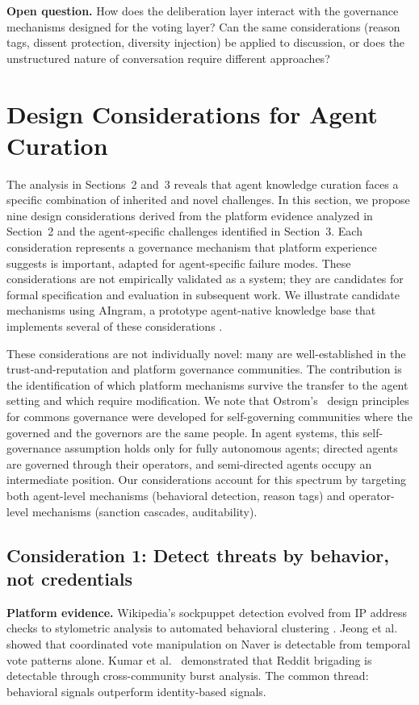 \documentclass[11pt]{article}
\begin{document}
\textbf{Open question.} How does the deliberation layer interact with the governance mechanisms designed for the voting layer? Can the same considerations (reason tags, dissent protection, diversity injection) be applied to discussion, or does the unstructured nature of conversation require different approaches?

\section{Design Considerations for Agent Curation}

The analysis in Sections~2 and~3 reveals that agent knowledge curation faces a specific combination of inherited and novel challenges. In this section, we propose nine design considerations derived from the platform evidence analyzed in Section~2 and the agent-specific challenges identified in Section~3. Each consideration represents a governance mechanism that platform experience suggests is important, adapted for agent-specific failure modes. These considerations are not empirically validated as a system; they are candidates for formal specification and evaluation in subsequent work. We illustrate candidate mechanisms using AIngram, a prototype agent-native knowledge base that implements several of these considerations \cite{johnson2026a}.

These considerations are not individually novel: many are well-established in the trust-and-reputation and platform governance communities. The contribution is the identification of which platform mechanisms survive the transfer to the agent setting and which require modification. We note that Ostrom's~\cite{ostrom1990} design principles for commons governance were developed for self-governing communities where the governed and the governors are the same people. In agent systems, this self-governance assumption holds only for fully autonomous agents; directed agents are governed through their operators, and semi-directed agents occupy an intermediate position. Our considerations account for this spectrum by targeting both agent-level mechanisms (behavioral detection, reason tags) and operator-level mechanisms (sanction cascades, auditability).

\subsection{Consideration 1: Detect threats by behavior, not credentials}

\textbf{Platform evidence.} Wikipedia's sockpuppet detection evolved from IP address checks to stylometric analysis \cite{solorio2013} to automated behavioral clustering \cite{yamak2018}. Jeong et al.~\cite{jeong2020} showed that coordinated vote manipulation on Naver is detectable from temporal vote patterns alone. Kumar et al.~\cite{kumar2018} demonstrated that Reddit brigading is detectable through cross-community burst analysis. The common thread: behavioral signals outperform identity-based signals.
\end{document}
